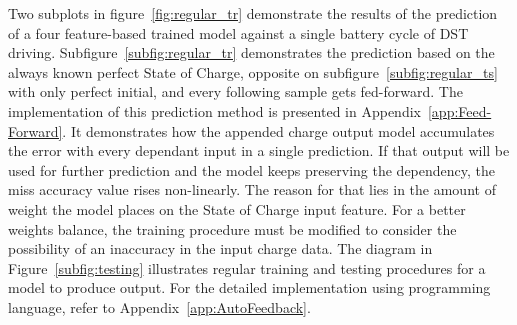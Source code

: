 %
%
Two subplots in figure~\ref{fig:regular_tr} demonstrate the results of the prediction of a four feature-based trained model against a single battery cycle of DST driving.
Subfigure~\ref{subfig:regular_tr} demonstrates the prediction based on the always known perfect State of Charge, opposite on subfigure~\ref{subfig:regular_ts} with only perfect initial, and every following sample gets fed-forward.
The implementation of this prediction method is presented in Appendix~\ref{app:Feed-Forward}.
It demonstrates how the appended charge output model accumulates the error with every dependant input in a single prediction.
If that output will be used for further prediction and the model keeps preserving the dependency, the miss accuracy value rises non-linearly.
The reason for that lies in the amount of weight the model places on the State of Charge input feature.
For a better weights balance, the training procedure must be modified to consider the possibility of an inaccuracy in the input charge data.
The diagram in Figure~\ref{subfig:testing} illustrates regular training and testing procedures for a model to produce output.
For the detailed implementation using programming language, refer to Appendix~\ref{app:AutoFeedback}.
